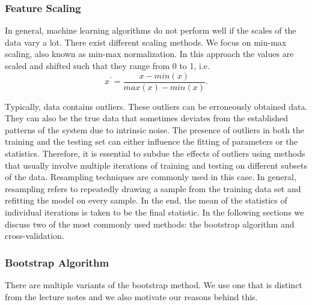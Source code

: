 \subsubsection{Feature Scaling}\label{subsubsec:scaling}
In general, machine learning algorithms do not perform well if the scales of the data vary a lot. There exist different scaling methods. We focus on min-max scaling, also known as min-max normalization. In this approach the values are scaled and shifted such that they range from 0 to 1, i.e. 
\begin{equation*}
    x^{'} = \frac{x - min(x)}{max(x) - min(x)}.
\end{equation*}

Typically, data contains outliers. These outliers can be erroneously obtained data. They can also be the true data that sometimes deviates from the established patterns of the system due to intrinsic noise. The presence of outliers in both the training and the testing set can either influence the fitting of parameters or the statistics. Therefore, it is essential to subdue the effects of outliers using methods that usually involve multiple iterations of training and testing on different subsets of the data. Resampling techniques are commonly used in this case. In general, resampling refers to repeatedly drawing a sample from the training data set and refitting the model on every sample. In the end, the mean of the statistics of individual iterations is taken to be the final statistic. \newline \newline In the following sections we discuss two of the most commonly used methods: the bootstrap algorithm and cross-validation. 
\subsubsection{Bootstrap Algorithm}\label{subsubsec:bootstrap}
There are multiple variants of the bootstrap method. We use one that is distinct from the lecture notes and we also motivate our reasons behind this. 

